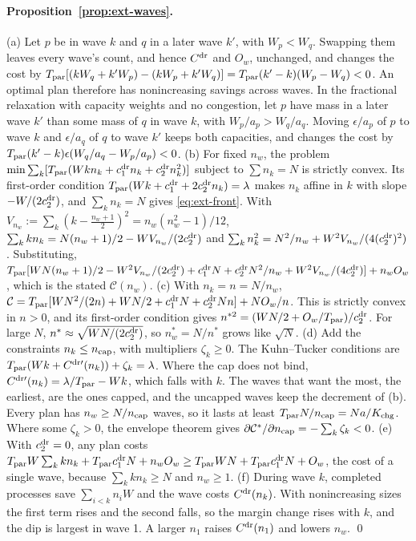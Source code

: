 \paragraph{Proposition~\ref{prop:ext-waves}.} (a) Let $p$ be in wave $k$ and $q$ in a later wave $k'$, with $W_p<W_q$. Swapping them leaves every wave's count, and hence $C^{\rm dr}$ and $O_w$, unchanged, and changes the cost by $T_{\rm par}[(kW_q+k'W_p)-(kW_p+k'W_q)]=T_{\rm par}(k'-k)(W_p-W_q)<0$. An optimal plan therefore has nonincreasing savings across waves. In the fractional relaxation with capacity weights and no congestion, let $p$ have mass in a later wave $k'$ than some mass of $q$ in wave $k$, with $W_p/a_p>W_q/a_q$. Moving $\epsilon/a_p$ of $p$ to wave $k$ and $\epsilon/a_q$ of $q$ to wave $k'$ keeps both capacities, and changes the cost by $T_{\rm par}(k'-k)\epsilon(W_q/a_q-W_p/a_p)<0$.
(b) For fixed $n_w$, the problem $\min\sum_k[T_{\rm par}(Wkn_k+c^{\rm dr}_1n_k+c^{\rm dr}_2n_k^2)]$ subject to $\sum n_k=N$ is strictly convex. Its first-order condition $T_{\rm par}(Wk+c^{\rm dr}_1+2c^{\rm dr}_2n_k)=\lambda$ makes $n_k$ affine in $k$ with slope $-W/(2c^{\rm dr}_2)$, and $\sum_kn_k=N$ gives \eqref{eq:ext-front}. With $V_{n_w}:=\sum_k(k-\tfrac{n_w+1}2)^2=n_w(n_w^2-1)/12$, $\sum_kkn_k=N(n_w+1)/2-WV_{n_w}/(2c^{\rm dr}_2)$ and $\sum_kn_k^2=N^2/n_w+W^2V_{n_w}/(4(c^{\rm dr}_2)^2)$. Substituting, $T_{\rm par}[WN(n_w+1)/2-W^2V_{n_w}/(2c^{\rm dr}_2)+c^{\rm dr}_1N+c^{\rm dr}_2N^2/n_w+W^2V_{n_w}/(4c^{\rm dr}_2)]+n_wO_w$, which is the stated $\mathcal C(n_w)$.
(c) With $n_k=n=N/n_w$, $\mathcal C=T_{\rm par}[WN^2/(2n)+WN/2+c^{\rm dr}_1N+c^{\rm dr}_2Nn]+NO_w/n$. This is strictly convex in $n>0$, and its first-order condition gives $n^{*2}=(WN/2+O_w/T_{\rm par})/c^{\rm dr}_2$. For large $N$, $n^*\approx\sqrt{WN/(2c^{\rm dr}_2)}$, so $n_w^*=N/n^*$ grows like $\sqrt N$.
(d) Add the constraints $n_k\le n_{\rm cap}$, with multipliers $\zeta_k\ge0$. The Kuhn--Tucker conditions are $T_{\rm par}(Wk+C^{\rm dr\prime}(n_k))+\zeta_k=\lambda$. Where the cap does not bind, $C^{\rm dr\prime}(n_k)=\lambda/T_{\rm par}-Wk$, which falls with $k$. The waves that want the most, the earliest, are the ones capped, and the uncapped waves keep the decrement of (b). Every plan has $n_w\ge N/n_{\rm cap}$ waves, so it lasts at least $T_{\rm par}N/n_{\rm cap}=Na/K_{\rm chg}$. Where some $\zeta_k>0$, the envelope theorem gives $\partial\mathcal C^*/\partial n_{\rm cap}=-\sum_k\zeta_k<0$.
(e) With $c^{\rm dr}_2=0$, any plan costs $T_{\rm par}W\sum_kkn_k+T_{\rm par}c^{\rm dr}_1N+n_wO_w\ge T_{\rm par}WN+T_{\rm par}c^{\rm dr}_1N+O_w$, the cost of a single wave, because $\sum_kkn_k\ge N$ and $n_w\ge1$.
(f) During wave $k$, completed processes save $\sum_{i<k}n_iW$ and the wave costs $C^{\rm dr}(n_k)$. With nonincreasing sizes the first term rises and the second falls, so the margin change rises with $k$, and the dip is largest in wave 1. A larger $n_1$ raises $C^{\rm dr}(n_1)$ and lowers $n_w$. \qed

